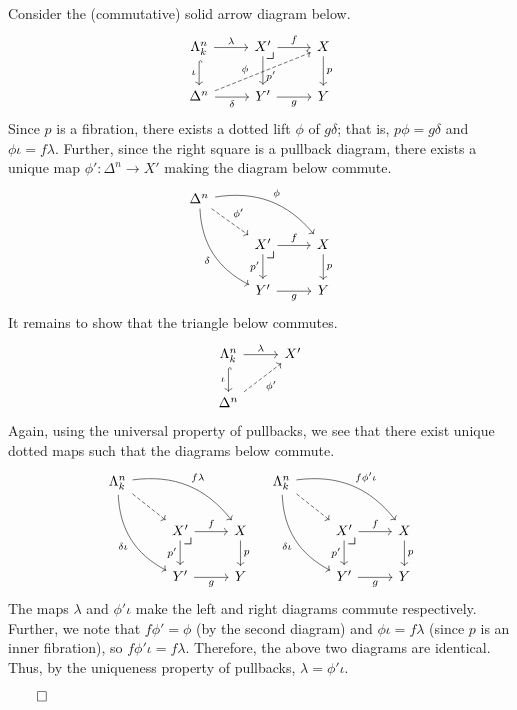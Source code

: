 \documentclass{MetricNotes2023}
\def\done{\begin{flushright}\vspace{-4.35ex}\(\qed\)\end{flushright}}
\begin{document}
\begin{ourproof}
Consider the (commutative) solid arrow diagram below.
\[\begin{tikzcd}
\Lambda^n_k \arrow[r, "\lambda"] \arrow[d, hookrightarrow, swap, "\iota"]  & X' \arrow[d, "p'" {yshift=-4pt}] \arrow[r, "f"] \arrow[dr, phantom, "\scalebox{1.3}{$\lrcorner$}" {xshift=-16pt, yshift=12pt}] & X \arrow[d, "p"]  \\
\Delta^n \arrow[r, swap, "\delta"] \arrow[urr, dashrightarrow, "\phi" {xshift=-8pt, yshift=-4pt}]  & Y' \arrow[r, swap, "g"] & Y
\end{tikzcd}\]
Since \(p\) is a fibration, there exists a dotted lift \(\phi\) of \(g \delta\); that is, \(p\phi = g \delta\) and \(\phi \iota = f \lambda\). Further, since the right square is a pullback diagram, there exists a unique map \(\phi' : \Delta^n \to X'\) making the diagram below commute.
\[\begin{tikzcd}
\Delta^n \arrow[rd, dashrightarrow, "\phi'"] \arrow[drr, bend left, "\phi"] \arrow[ddr, swap, bend right, "\delta"] & &  \\
 & X' \arrow[r, "f"] \arrow[d, swap, "p'"] \arrow[dr, phantom, "\scalebox{1.3}{$\lrcorner$}" {xshift=-16pt, yshift=10pt}]  & X \arrow[d, "p"] \\
 & Y' \arrow[r, swap, "g"] & Y
\end{tikzcd}\]
It remains to show that the triangle below commutes.
\[\begin{tikzcd}
\Lambda^n_k \arrow[r, "\lambda"] \arrow[d, hookrightarrow, swap, "\iota"]  & X' \\
\Delta^n \arrow[ur, dashrightarrow, swap, "\phi'"]  & 
\end{tikzcd}\]
Again, using the universal property of pullbacks, we see that there exist unique dotted maps such that the diagrams below commute.
\[\begin{tikzcd}
\Lambda^n_k \arrow[rd, dashrightarrow, ""] \arrow[drr, bend left, "f \lambda"] \arrow[ddr, swap, bend right, "\delta\iota"] & &  \\
 & X' \arrow[r, "f"] \arrow[d, swap, "p'"] \arrow[dr, phantom, "\scalebox{1.3}{$\lrcorner$}" {xshift=-16pt, yshift=10pt}] & X \arrow[d, "p"] \\
 & Y' \arrow[r, swap, "g"] & Y
\end{tikzcd} \quad \begin{tikzcd}
\Lambda^n_k \arrow[rd, dashrightarrow, ""] \arrow[drr, bend left, "f\phi'\iota"] \arrow[ddr, swap, bend right, "\delta\iota"] & &  \\
 & X' \arrow[r, "f"] \arrow[d, swap, "p'"] \arrow[dr, phantom, "\scalebox{1.3}{$\lrcorner$}" {xshift=-16pt, yshift=10pt}] & X \arrow[d, "p"] \\
 & Y' \arrow[r, swap, "g"] & Y
\end{tikzcd}\]
The maps \(\lambda\) and \(\phi'\iota\) make the left and right diagrams commute respectively. Further, we note that \(f\phi' = \phi\) (by the second diagram) and \(\phi \iota =f \lambda\) (since \(p\) is an inner fibration), so \(f\phi'\iota=f \lambda\). Therefore, the above two diagrams are identical. Thus, by the uniqueness property of pullbacks, \(\lambda = \phi'\iota\). \done
\end{ourproof}
\end{document}
